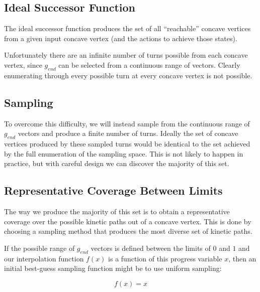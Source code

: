 	\subsection{Ideal Successor Function}

The ideal successor function produces the set of all ``reachable'' concave vertices from a given input concave vertex (and the actions to achieve those states).

Unfortunately there are an infinite number of turns possible from each concave vertex, since $g_{end}$ can be selected from a continuous range of vectors. Clearly enumerating through every possible turn at every concave vertex is not possible.

	\subsection{Sampling}

To overcome this difficulty, we will instead sample from the continuous range of $g_{end}$ vectors and produce a finite number of turns. Ideally the set of concave vertices produced by these sampled turns would be identical to the set achieved by the full enumeration of the sampling space. This is not likely to happen in practice, but with careful design we can discover the majority of this set.


	\subsection{Representative Coverage Between Limits}

The way we produce the majority of this set is to obtain a representative coverage over the possible kinetic paths out of a concave vertex. This is done by choosing a sampling method that produces the most diverse set of kinetic paths.

If the possible range of $g_{end}$ vectors is defined between the limits of $0$ and $1$ and our interpolation function $f(x)$ is a function of this progress variable $x$, then an initial best-guess sampling function might be to use uniform sampling:

$$
f(x) = x
$$

